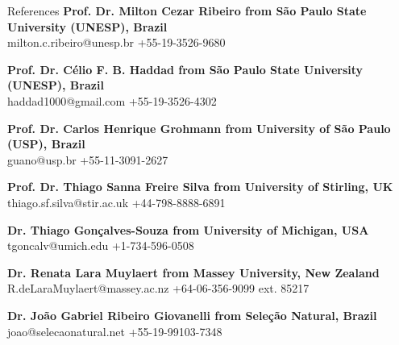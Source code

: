 \documentclass{resume}
\begin{document}
\begin{rSection}{References}
{\bf Prof. Dr. Milton Cezar Ribeiro from São Paulo State University (UNESP), Brazil} 
\\ milton.c.ribeiro@unesp.br +55-19-3526-9680

{\bf Prof. Dr. Célio F. B. Haddad from São Paulo State University (UNESP), Brazil} 
\\ haddad1000@gmail.com +55-19-3526-4302

{\bf Prof. Dr. Carlos Henrique Grohmann from University of São Paulo (USP), Brazil} 
\\ guano@usp.br +55-11-3091-2627

{\bf Prof. Dr. Thiago Sanna Freire Silva from University of Stirling, UK} 
\\ thiago.sf.silva@stir.ac.uk +44-798-8888-6891

{\bf Dr. Thiago Gonçalves-Souza from University of Michigan, USA} 
\\ tgoncalv@umich.edu +1-734-596-0508

{\bf Dr. Renata Lara Muylaert from Massey University, New Zealand} 
\\ R.deLaraMuylaert@massey.ac.nz +64-06-356-9099 ext. 85217

{\bf Dr. João Gabriel Ribeiro Giovanelli from Seleção Natural, Brazil} 
\\ joao@selecaonatural.net +55-19-99103-7348

\end{rSection}
\end{document}
